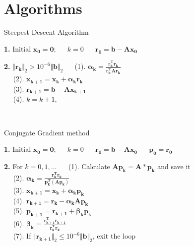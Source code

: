 \documentclass[fleqn]{article}
\begin{document}
\hline
\newpage
\section{ Algorithms}

\begin{algorithm}
         \caption{Steepest Descent Algorithm}              
         \label{alg1}                         
         \begin{algorithmic}
         \STATE \textbf{1.} Initial  $\bm{x_0} = \bm{0}$;
         \STATE  $\quad$ $k = 0$
         \STATE  $\quad$ $\bm{r_0} = \bm{b} - \bm{A}\bm{x_0}$
        
         
         \STATE \textbf{2.}   $\Vert\bm{r_{k}}\Vert_2 > 10^{-6}\Vert\bm{b}\Vert_2$
         \STATE $\quad$ (1). $\bm{\alpha_k} = \frac{\bm{r_k^T}\bm{r_k}}{\bm{r_k^T}\bm{A}\bm{r_k}}$\\[1ex]
         \STATE $\quad$ (2). $\bm{x_{k+1}} = \bm{x_k} + \bm{\alpha_k}\bm{r_k}$\\[1ex]
         \STATE $\quad$ (3).  $\bm{r_{k+1}} = \bm{b} - \bm{A}\bm{x_{k+1}}$\\[1ex]
         \STATE $\quad$ (4).  $k = k + 1$,
        
         \STATE $\qquad$ 
        \end{algorithmic}
\end{algorithm}

\begin{algorithm}
\caption{Conjugate Gradient method}            
         \begin{algorithmic}
         \STATE \textbf{1.} Initial  $\bm{x_0} = \bm{0}$;
         \STATE  $\quad$ $k = 0$
         \STATE  $\quad$ $\bm{r_0} = \bm{b} - \bm{A}\bm{x_0}$
        \STATE  $\quad$ $\bm{p_0} = \bm{r_0}$
        
         
         \STATE \textbf{2.} For $k = 0, 1, \dots$
         \STATE $\quad$ (1). Calculate $\bm{Ap_k} = \bm{A}*\bm{p_k}$ and save it\\[1ex]
         \STATE $\quad$ (2). $\bm{\alpha_k} = \frac{\bm{r_k^T}\bm{r_k}}{\bm{p_k^T}(\bm{Ap_k})}$\\[1ex]
         \STATE $\quad$ (3). $\bm{x_{k+1}} = \bm{x_k} + \bm{\alpha_k}\bm{p_k}$\\[1ex]
         \STATE $\quad$ (4). $\bm{r_{k+1}} = \bm{r_k} - \bm{\alpha_k}\bm{Ap_k}$\\[1ex]
         \STATE $\quad$ (5). $\bm{p_{k+1}} = \bm{r_{k+1}}+\bm{\beta_k}\bm{p_k}$\\[1ex]
         \STATE $\quad$ (6). $\bm{\beta_k} = \frac{\bm{r_{k+1}^T}\bm{r_{k+1}}}{\bm{r_k^T}\bm{r_k}}$\\[1ex]
         \STATE $\quad$ (7). If $\Vert\bm{r_{k+1}}\Vert_2 \le 10^{-6}\Vert\bm{b}\Vert_2$, exit the loop
        \end{algorithmic}
\end{algorithm}
    
\end{document}
